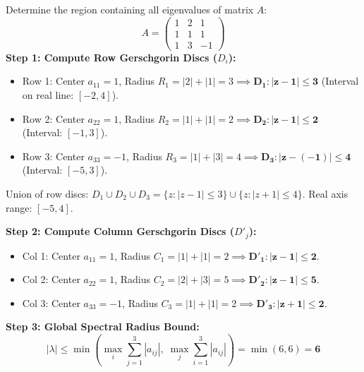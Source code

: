 \begin{examplebox}
Determine the region containing all eigenvalues of matrix $A$:
\begin{equation}
    A = \begin{pmatrix}
    1 & 2 & 1 \\
    1 & 1 & 1 \\
    1 & 3 & -1
    \end{pmatrix}
\end{equation}
\textbf{Step 1: Compute Row Gerschgorin Discs ($D_i$):}
\begin{itemize}[noitemsep]
    \item Row 1: Center $a_{11} = 1$, Radius $R_1 = |2| + |1| = 3 \implies \mathbf{D_1: |z - 1| \le 3}$ (Interval on real line: $[-2, 4]$).
    \item Row 2: Center $a_{22} = 1$, Radius $R_2 = |1| + |1| = 2 \implies \mathbf{D_2: |z - 1| \le 2}$ (Interval: $[-1, 3]$).
    \item Row 3: Center $a_{33} = -1$, Radius $R_3 = |1| + |3| = 4 \implies \mathbf{D_3: |z - (-1)| \le 4}$ (Interval: $[-5, 3]$).
\end{itemize}
Union of row discs: $D_1 \cup D_2 \cup D_3 = \{z : |z - 1| \le 3\} \cup \{z : |z + 1| \le 4\}$. Real axis range: $[-5, 4]$.

\textbf{Step 2: Compute Column Gerschgorin Discs ($D'_j$):}
\begin{itemize}[noitemsep]
    \item Col 1: Center $a_{11} = 1$, Radius $C_1 = |1| + |1| = 2 \implies \mathbf{D'_1: |z - 1| \le 2}$.
    \item Col 2: Center $a_{22} = 1$, Radius $C_2 = |2| + |3| = 5 \implies \mathbf{D'_2: |z - 1| \le 5}$.
    \item Col 3: Center $a_{33} = -1$, Radius $C_3 = |1| + |1| = 2 \implies \mathbf{D'_3: |z + 1| \le 2}$.
\end{itemize}
\textbf{Step 3: Global Spectral Radius Bound:}
\begin{equation}
    |\lambda| \le \min\left( \max_i \sum_{j=1}^3 |a_{ij}|, \; \max_j \sum_{i=1}^3 |a_{ij}| \right) = \min(6, 6) = \mathbf{6}
\end{equation}
\end{examplebox}

